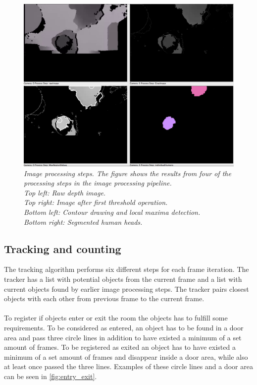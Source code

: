 \begin{figure}[htb]
	\centering
	\includegraphics[width=\linewidth]{images/image_processing_steps.png}
	\caption[Image processing steps]{\textit{Image processing steps. The figure shows the results from four of the processing steps in the image processing pipeline.\\
		Top left: Raw depth image.\\ 
		Top right: Image after first threshold operation.\\ 
		Bottom left: Contour drawing and local maxima detection.\\ 
		Bottom right: Segmented human heads.}}
	\label{fig:image_processing_steps}  %
\end{figure}

\newpage
\subsection{Tracking and counting}
The tracking algorithm performs six different steps for each frame iteration. The tracker has a list with potential objects from the current frame and a list with current objects found by earlier image processing steps. The tracker pairs closest objects with each other from previous frame to the current frame. 
\\ \\
To register if objects enter or exit the room the objects has to fulfill some requirements. To be considered as entered, an object has to be found in a door area and pass three circle lines in addition to have existed a minimum of a set amount of frames. To be registered as exited an object has to have existed a minimum of a set amount of frames and disappear inside a door area, while also at least once passed the three lines. Examples of these circle lines and a door area can be seen in \ref{fig:entry_exit}.

